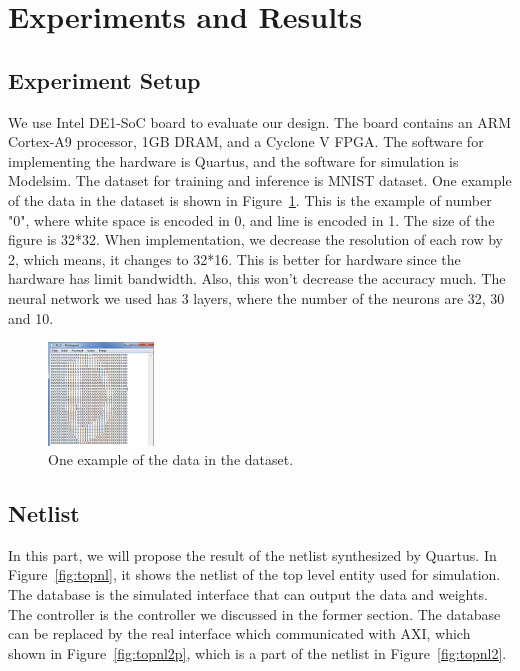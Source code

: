 \documentclass[conference]{IEEEtran}
\begin{document}
\section{Experiments and Results}
\label{sec:exp}
\subsection{Experiment Setup}

We use Intel DE1-SoC board to evaluate our design. The board contains an ARM Cortex-A9 processor, 1GB DRAM, and a Cyclone V FPGA. The software for implementing the hardware is Quartus, and the software for simulation is Modelsim. The dataset for training and inference is MNIST dataset. One example of the data in the dataset is shown in Figure~\ref{fig:data}. This is the example of number "0", where white space is encoded in 0, and line is encoded in 1. The size of the figure is 32*32. When implementation, we decrease the resolution of each row by 2, which means, it changes to 32*16. This is better for hardware since the hardware has limit bandwidth. Also, this won't decrease the accuracy much. The neural network we used has 3 layers, where the number of the neurons are 32, 30 and 10. 

\begin{figure}[!hbt]
	\centering
	\includegraphics[width=0.25\textwidth]{data.png}
	\caption{One example of the data in the dataset.}
	\label{fig:data}
\end{figure}

\subsection{Netlist}

In this part, we will propose the result of the netlist synthesized by Quartus. In Figure~\ref{fig:topnl}, it shows the netlist of the top level entity used for simulation. The database is the simulated interface that can output the data and weights. The controller is the controller we discussed in the former section. The database can be replaced by the real interface which communicated with AXI, which shown in Figure~\ref{fig:topnl2p}, which is a part of the netlist in Figure~\ref{fig:topnl2}. 
\end{document}
